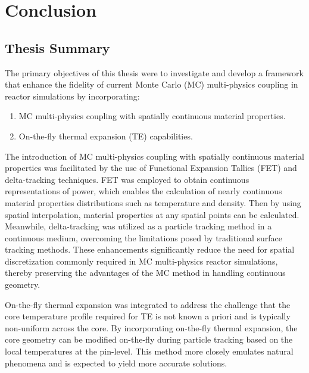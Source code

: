\section{Conclusion}  \label{s5}

\subsection{Thesis Summary}

The primary objectives of this thesis were to investigate and develop a framework that enhance the fidelity of current Monte Carlo (MC) multi-physics coupling in reactor simulations by incorporating:
\begin{enumerate}
    \item MC multi-physics coupling with spatially continuous material properties.
    \item On-the-fly thermal expansion (TE) capabilities.
\end{enumerate}

The introduction of MC multi-physics coupling with spatially continuous material properties was facilitated by the use of Functional Expansion Tallies (FET) and delta-tracking techniques. FET was employed to obtain continuous representations of power, which enables the calculation of nearly continuous material properties distributions such as temperature and density. Then by using spatial interpolation, material properties at any spatial points can be calculated. Meanwhile, delta-tracking was utilized as a particle tracking method in a continuous medium, overcoming the limitations posed by traditional surface tracking methods. These enhancements significantly reduce the need for spatial discretization commonly required in MC multi-physics reactor simulations, thereby preserving the advantages of the MC method in handling continuous geometry.

On-the-fly thermal expansion was integrated to address the challenge that the core temperature profile required for TE is not known a priori and is typically non-uniform across the core. By incorporating on-the-fly thermal expansion, the core geometry can be modified on-the-fly during particle tracking based on the local temperatures at the pin-level. This method more closely emulates natural phenomena and is expected to yield more accurate solutions.

